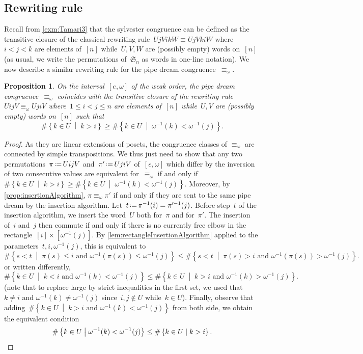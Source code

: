 \documentclass[reqno]{amsart}
\newtheorem{proposition}[theorem]{Proposition}
\theoremstyle{definition}
\newcommand{\set}[2]{\left\{ #1 \;\middle|\; #2 \right\}} %
\newcommand{\eqdef}{\mbox{\,\raisebox{0.2ex}{\scriptsize\ensuremath{\mathrm:}}\ensuremath{=}\,}} %
\newcommand{\fS}{\mathfrak{S}} %
\begin{document}

\subsection{Rewriting rule}
\label{subsec:rewritingRule}

Recall from \cref{exm:Tamari3} that the sylvester congruence can be defined as the transitive closure of the classical rewriting rule~$UjVikW \equiv UjVkiW$ where~$i < j < k$ are elements of~$[n]$ while~$U, V, W$ are (possibly empty) words on~$[n]$ (as usual, we write the permutations of~$\fS_n$ as words in one-line notation).
We now describe a similar rewriting rule for the pipe dream congruence~$\equiv_\omega$.

\begin{proposition}
\label{prop:rewritingRule}
On the interval~$[e,\omega]$ of the weak order, the pipe dream congruence~$\equiv_\omega$ coincides with the transitive closure of the rewriting rule~$U ij V \equiv_\omega U ji V$ where~$1 \le i < j \le n$ are elements of~$[n]$ while~$U, V$ are (possibly empty) words on~$[n]$ such that
\[
\# \set{k \in U}{k > i} \ge \# \set{k \in U}{\omega^{-1}(k) < \omega^{-1}(j)}.
\]
\end{proposition}

\begin{proof}
As they are linear extensions of posets, the congruence classes of $\equiv_\omega$ are connected by simple transpositions.
We thus just need to show that any two permutations~$\pi \eqdef UijV$ and~$\pi' \eqdef UjiV$ of~$[e, \omega]$ which differ by the inversion of two consecutive values are equivalent for~$\equiv_\omega$ if and only if~$\# \set{k \in U}{k > i} \ge \# \set{k \in U}{\omega^{-1}(k) < \omega^{-1}(j)}$.
Moreover, by \cref{prop:insertionAlgorithm}, $\pi \equiv_\omega \pi'$ if and only if they are sent to the same pipe dream by the insertion algorithm.
Let~$t \eqdef \pi^{-1}(i) = \pi'^{-1}(j)$.
Before step~$t$ of the insertion algorithm, we insert the word~$U$ both for~$\pi$ and for~$\pi'$.
The insertion of~$i$ and~$j$ then commute if and only if there is no currently free elbow in the rectangle~$[i] \times [\omega^{-1}(j)]$.
By \cref{lem:rectangleInsertionAlgorithm} applied to the parameters~$t, i, \omega^{-1}(j)$, this is equivalent to
\[
\# \set{s < t}{\pi(s) \le i \text{ and } \omega^{-1}(\pi(s)) \le \omega^{-1}(j)} \le \# \set{s < t}{\pi(s) > i \text{ and } \omega^{-1}(\pi(s)) > \omega^{-1}(j)}.
\]
or written differently,
\[
\# \set{k \in U}{k < i \text{ and } \omega^{-1}(k) < \omega^{-1}(j)} \le \# \set{k \in U}{k > i \text{ and } \omega^{-1}(k) > \omega^{-1}(j)}.
\]
(note that  to replace large by strict inequalities in the first set, we used that~$k \ne i$ and ${\omega^{-1}(k) \ne \omega^{-1}(j)}$ since~$i,j \notin U$ while~$k \in U$).
Finally, observe that adding~$\# \set{k \in U}{k > i \text{ and } \omega^{-1}(k) < \omega^{-1}(j)}$ from both side, we obtain the equivalent condition
\[
\# \set{k \in U}{\omega^{-1}(k) < \omega^{-1}(j)} \le \# \set{k \in U}{k > i}.
\qedhere
\]
\end{proof}
\end{document}
